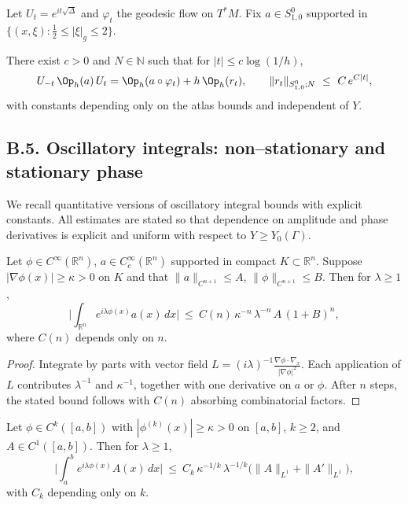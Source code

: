 Let $U_t=e^{it\sqrt\Delta}$ and $\varphi_t$ the geodesic flow on $T^*M$. Fix $a\in S^0_{1,0}$ supported in $\{(x,\xi):\tfrac12\le|\xi|_g\le2\}$.

\begin{theorem}[Egorov]
\label{thm:B-egorov}
There exist $c>0$ and $N\in\mathbb N$ such that for $|t|\le c\log(1/h)$,
\[
U_{-t}\,\Op_h(a)\,U_t=\Op_h(a\circ\varphi_t)+h\,\Op_h(r_t),\qquad
\|r_t\|_{S^0_{1,0};N}\ \le\ C\,e^{C|t|},
\]
with constants depending only on the atlas bounds and independent of $Y$.
\end{theorem}


\subsection*{B.5. Oscillatory integrals: non–stationary and stationary phase}
\label{subsec:B5-oscillatory}

We recall quantitative versions of oscillatory integral bounds with explicit constants.
All estimates are stated so that dependence on amplitude and phase derivatives is explicit
and uniform with respect to $Y\ge Y_0(\Gamma)$.

\begin{lemma}
\label{lem:B-nonstat}
Let $\phi\in C^\infty(\mathbb R^n)$, $a\in C_c^\infty(\mathbb R^n)$ supported in compact
$K\subset\mathbb R^n$. Suppose $|\nabla\phi(x)|\ge \kappa>0$ on $K$ and that
$\|a\|_{C^{n+1}}\le A$, $\|\phi\|_{C^{n+1}}\le B$. Then for $\lambda\ge1$,
\[
\Big|\int_{\mathbb R^n} e^{i\lambda\phi(x)} a(x)\,dx\Big|
\ \le\ C(n)\,\kappa^{-n}\,\lambda^{-n}\,A\,(1+B)^n,
\]
where $C(n)$ depends only on $n$.
\end{lemma}

\begin{proof}
Integrate by parts with vector field
$L=(i\lambda)^{-1}\frac{\nabla\phi\cdot\nabla_x}{|\nabla\phi|^2}$.
Each application of $L$ contributes $\lambda^{-1}$ and $\kappa^{-1}$,
together with one derivative on $a$ or $\phi$.
After $n$ steps, the stated bound follows with $C(n)$ absorbing combinatorial factors.
\end{proof}

\begin{lemma}
\label{lem:B-VdC}
Let $\phi\in C^k([a,b])$ with $|\phi^{(k)}(x)|\ge\kappa>0$ on $[a,b]$, $k\ge2$,
and $A\in C^1([a,b])$. Then for $\lambda\ge1$,
\[
\Big|\int_a^b e^{i\lambda\phi(x)}A(x)\,dx\Big|
\ \le\ C_k\,\kappa^{-1/k}\,\lambda^{-1/k}\Big(\|A\|_{L^1}+\|A'\|_{L^1}\Big),
\]
with $C_k$ depending only on $k$.
\end{lemma}


